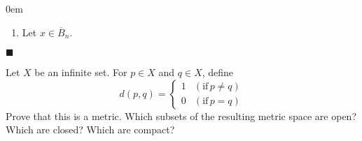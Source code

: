 \documentclass[12pt]{article}
\renewcommand{\qed}{\hfill$\blacksquare$}
\renewenvironment{proof}{\begin{addmargin}[1em]{0em}\begin{newproof}}{\end{newproof}\end{addmargin}\qed}
\newenvironment{problem}[2][Exercise]{\begin{trivlist}
\item[\hskip \labelsep {\bfseries #1}\hskip \labelsep {\bfseries #2.}]}{\end{trivlist}}
\begin{document}
\begin{proof}
\begin{enumerate}[label=(\alph*)]
	\item Let $x \in \overline{B}_n$. 
\end{enumerate}
\end{proof}




\begin{problem}{2.10}
Let $X$ be an infinite set. For $p\in X$ and $q\in X$, define
\begin{equation*}
 d\left(p,q\right) = \left\{ \begin{array}{lr} 1 & \left(\text{if}\, p\neq q\right) \\ 0 & \left(\text{if}\, p=q\right) \end{array} \right.
\end{equation*}
Prove that this is a metric. Which subsets of the resulting metric space are open? Which are closed? Which are compact?
\end{problem}
\end{document}
